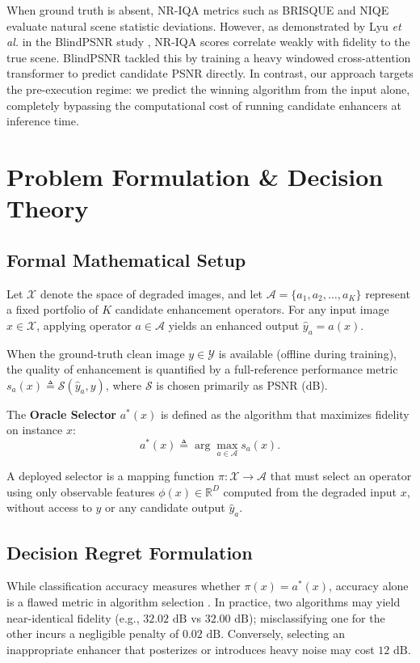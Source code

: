 \documentclass[journal]{IEEEtran}
\begin{document}
When ground truth is absent, NR-IQA metrics such as BRISQUE \cite{mittal2012no} and NIQE \cite{mittal2013making} evaluate natural scene statistic deviations. However, as demonstrated by Lyu \textit{et al.} in the BlindPSNR study \cite{lyu2026blindpsnr}, NR-IQA scores correlate weakly with fidelity to the true scene. BlindPSNR tackled this by training a heavy windowed cross-attention transformer to predict candidate PSNR directly. In contrast, our approach targets the pre-execution regime: we predict the winning algorithm from the input alone, completely bypassing the computational cost of running candidate enhancers at inference time.

\section{Problem Formulation \& Decision Theory}

\subsection{Formal Mathematical Setup}
Let $\mathcal{X}$ denote the space of degraded images, and let $\mathcal{A} = \{a_1, a_2, \dots, a_K\}$ represent a fixed portfolio of $K$ candidate enhancement operators. For any input image $x \in \mathcal{X}$, applying operator $a \in \mathcal{A}$ yields an enhanced output $\hat{y}_a = a(x)$.

When the ground-truth clean image $y \in \mathcal{Y}$ is available (offline during training), the quality of enhancement is quantified by a full-reference performance metric $s_a(x) \triangleq \mathcal{S}(\hat{y}_a, y)$, where $\mathcal{S}$ is chosen primarily as PSNR (dB).

The \textbf{Oracle Selector} $a^*(x)$ is defined as the algorithm that maximizes fidelity on instance $x$:
\begin{equation}
a^*(x) \triangleq \arg\max_{a \in \mathcal{A}} s_a(x).
\label{eq:oracle_definition}
\end{equation}

A deployed selector is a mapping function $\pi: \mathcal{X} \to \mathcal{A}$ that must select an operator using only observable features $\phi(x) \in \mathbb{R}^D$ computed from the degraded input $x$, without access to $y$ or any candidate output $\hat{y}_a$.

\subsection{Decision Regret Formulation}
While classification accuracy measures whether $\pi(x) = a^*(x)$, accuracy alone is a flawed metric in algorithm selection \cite{bischl2016aslib}. In practice, two algorithms may yield near-identical fidelity (e.g., $32.02\text{ dB}$ vs $32.00\text{ dB}$); misclassifying one for the other incurs a negligible penalty of $0.02\text{ dB}$. Conversely, selecting an inappropriate enhancer that posterizes or introduces heavy noise may cost $12\text{ dB}$.
\end{document}
